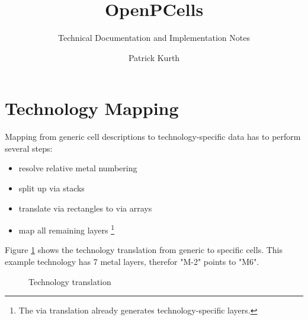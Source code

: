 

\title{OpenPCells}
\subtitle{Technical Documentation and Implementation Notes}
\author{Patrick Kurth}


\maketitle
\section{Technology Mapping}
Mapping from generic cell descriptions to technology-specific data has to perform several steps:
\begin{itemize}
    \item resolve relative metal numbering
    \item split up via stacks
    \item translate via rectangles to via arrays
    \item map all remaining layers \footnote{The via translation already generates technology-specific layers.}
\end{itemize}

Figure \ref{fig:techtranslation} shows the technology translation from generic to specific cells. This example technology has 7 metal layers, therefor "M-2" points
to "M6".
\begin{figure}[htb]
    \centering
    \caption{Technology translation}
    \label{fig:techtranslation}
\end{figure}

